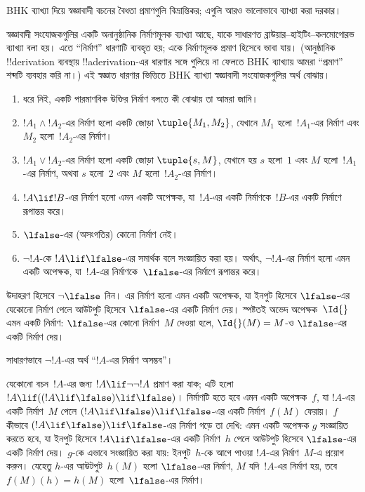 \documentclass[../../../include/open-logic-section]{subfiles}
\begin{document}


\begin{editorial}
  BHK ব্যাখ্যা দিয়ে স্বজ্ঞাবাদী বচনের বৈধতা প্রমাণগুলি বিভ্রান্তিকর;
  এগুলি আরও ভালোভাবে ব্যাখ্যা করা দরকার।
\end{editorial}

স্বজ্ঞাবাদী সংযোজকগুলির একটি অনানুষ্ঠানিক নির্মাণমূলক ব্যাখ্যা আছে,
যাকে সাধারণত ব্রাউয়ার--হাইটিং--কলমোগোরভ ব্যাখ্যা বলা হয়। এতে
``নির্মাণ'' ধারণাটি ব্যবহৃত হয়; একে নির্মাণমূলক প্রমাণ হিসেবে ভাবা যায়। (আনুষ্ঠানিক !!{derivation} ব্যবস্থায় !!a{derivation}-এর ধারণার
সঙ্গে গুলিয়ে না ফেলতে BHK ব্যাখ্যায় আমরা ``প্রমাণ'' শব্দটি ব্যবহার
করি না।) এই স্বজ্ঞাত ধারণার ভিত্তিতে BHK ব্যাখ্যা স্বজ্ঞাবাদী
সংযোজকগুলির অর্থ বোঝায়।

\begin{enumerate}
\item ধরে নিই, একটি পারমাণবিক উক্তির নির্মাণ বলতে কী বোঝায় তা আমরা জানি।
\item $!A_1 \land !A_2$-এর নির্মাণ হলো একটি জোড়া $\tuple{M_1, M_2}$,
  যেখানে $M_1$ হলো~$!A_1$-এর নির্মাণ এবং $M_2$ হলো~$!A_2$-এর নির্মাণ।
\item $!A_1 \lor !A_2$-এর নির্মাণ হলো একটি জোড়া $\tuple{s, M}$,
  যেখানে হয় $s$ হলো~$1$ এবং $M$ হলো~$!A_1$-এর নির্মাণ, অথবা $s$ হলো~$2$
  এবং $M$ হলো~$!A_2$-এর নির্মাণ।
\item $!A \lif !B$-এর নির্মাণ হলো এমন একটি অপেক্ষক, যা~$!A$-এর
  একটি নির্মাণকে~$!B$-এর একটি নির্মাণে রূপান্তর করে।
\item $\lfalse$-এর (অসংগতির) কোনো নির্মাণ নেই।
\item $\lnot !A$-কে $!A \lif \lfalse$-এর সমার্থক বলে সংজ্ঞায়িত
  করা হয়। অর্থাৎ, $\lnot !A$-এর নির্মাণ হলো এমন একটি অপেক্ষক, যা~$!A$-এর
  নির্মাণকে~$\lfalse$-এর নির্মাণে রূপান্তর করে।
\end{enumerate}

\begin{ex}
উদাহরণ হিসেবে $\lnot \lfalse$ নিন। এর নির্মাণ হলো এমন একটি অপেক্ষক,
যা ইনপুট হিসেবে $\lfalse$-এর যেকোনো নির্মাণ পেলে আউটপুট হিসেবে
$\lfalse$-এর একটি নির্মাণ দেয়। স্পষ্টতই অভেদ অপেক্ষক~$\Id{}$ এমন একটি
নির্মাণ: $\lfalse$-এর কোনো নির্মাণ~$M$ দেওয়া হলে,
$\Id{}(M) = M$-ও $\lfalse$-এর একটি নির্মাণ দেয়।
\end{ex}

সাধারণভাবে $\lnot !A$-এর অর্থ ``$!A$-এর নির্মাণ অসম্ভব''।

\begin{ex}
যেকোনো বচন~$!A$-এর জন্য $!A \lif \lnot \lnot !A$ প্রমাণ করা যাক;
এটি হলো $!A \lif ((!A \lif \lfalse) \lif \lfalse)$। নির্মাণটি হতে
হবে এমন একটি অপেক্ষক~$f$, যা $!A$-এর একটি নির্মাণ~$M$ পেলে
$(!A \lif \lfalse) \lif \lfalse$-এর একটি নির্মাণ~$f(M)$ ফেরায়।
$f$ কীভাবে $(!A \lif \lfalse) \lif \lfalse$-এর নির্মাণ গড়ে তা
দেখি: এমন একটি অপেক্ষক $g$ সংজ্ঞায়িত করতে হবে, যা ইনপুট হিসেবে
$!A \lif \lfalse$-এর একটি নির্মাণ~$h$ পেলে আউটপুট হিসেবে
$\lfalse$-এর একটি নির্মাণ দেয়। $g$-কে এভাবে সংজ্ঞায়িত করা যায়:
ইনপুট~$h$-কে আগে পাওয়া $!A$-এর নির্মাণ~$M$-এ প্রয়োগ করুন। যেহেতু
$h$-এর আউটপুট~$h(M)$ হলো $\lfalse$-এর নির্মাণ, $M$ যদি~$!A$-এর
নির্মাণ হয়, তবে $f(M)(h) = h(M)$ হলো~$\lfalse$-এর নির্মাণ।
\end{ex}
\end{document}
